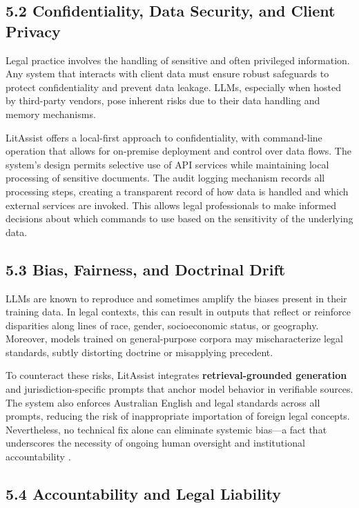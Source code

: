 \documentclass[12pt,a4paper]{article}
\begin{document}
\subsection*{5.2 Confidentiality, Data Security, and Client Privacy}

Legal practice involves the handling of sensitive and often privileged information. Any system that interacts with client data must ensure robust safeguards to protect confidentiality and prevent data leakage. LLMs, especially when hosted by third-party vendors, pose inherent risks due to their data handling and memory mechanisms.

LitAssist offers a local-first approach to confidentiality, with command-line operation that allows for on-premise deployment and control over data flows. The system's design permits selective use of API services while maintaining local processing of sensitive documents. The audit logging mechanism records all processing steps, creating a transparent record of how data is handled and which external services are invoked. This allows legal professionals to make informed decisions about which commands to use based on the sensitivity of the underlying data.

\subsection*{5.3 Bias, Fairness, and Doctrinal Drift}

LLMs are known to reproduce and sometimes amplify the biases present in their training data. In legal contexts, this can result in outputs that reflect or reinforce disparities along lines of race, gender, socioeconomic status, or geography. Moreover, models trained on general-purpose corpora may mischaracterize legal standards, subtly distorting doctrine or misapplying precedent.

To counteract these risks, LitAssist integrates \textbf{retrieval-grounded generation} and jurisdiction-specific prompts that anchor model behavior in verifiable sources. The system also enforces Australian English and legal standards across all prompts, reducing the risk of inappropriate importation of foreign legal concepts. Nevertheless, no technical fix alone can eliminate systemic bias—a fact that underscores the necessity of ongoing human oversight and institutional accountability \cite{Floridi2022}.

\subsection*{5.4 Accountability and Legal Liability}
\end{document}
